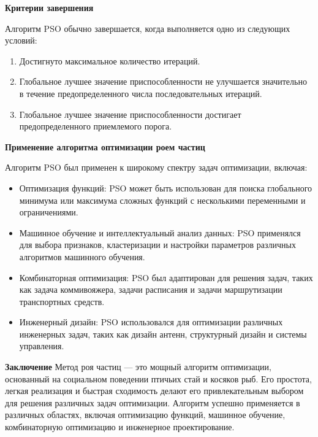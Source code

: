 \textbf{Критерии завершения}

Алгоритм PSO обычно завершается, когда выполняется одно из следующих условий:

\begin{enumerate}
\item Достигнуто максимальное количество итераций.
\item Глобальное лучшее значение приспособленности не улучшается
значительно в течение предопределенного числа последовательных итераций.
\item Глобальное лучшее значение приспособленности
достигает предопределенного приемлемого порога.
\end{enumerate}

\textbf{Применение алгоритма оптимизации роем частиц}

Алгоритм PSO был применен к широкому спектру задач оптимизации, включая:

\begin{itemize}
\item Оптимизация функций: PSO может быть использован для поиска
глобального минимума или максимума сложных функций
с несколькими переменными и ограничениями.
\item Машинное обучение и интеллектуальный анализ данных:
PSO применялся для выбора признаков, кластеризации и настройки
параметров различных алгоритмов машинного обучения.
\item Комбинаторная оптимизация: PSO был адаптирован для решения задач,
таких как задача коммивояжера, задачи расписания
и задачи маршрутизации транспортных средств.
\item Инженерный дизайн: PSO использовался для оптимизации различных
инженерных задач, таких как дизайн антенн,
структурный дизайн и системы управления.
\end{itemize}

\textbf{Заключение}
Метод роя частиц — это мощный алгоритм оптимизации,
основанный на социальном поведении птичьих стай и косяков рыб.
Его простота, легкая реализация и быстрая сходимость делают его
привлекательным выбором для решения различных задач оптимизации.
Алгоритм успешно применяется в различных областях, включая
оптимизацию функций, машинное обучение,
комбинаторную оптимизацию и инженерное проектирование.
